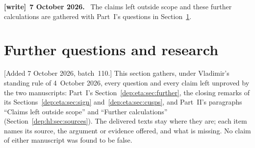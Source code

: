 \documentclass[11pt]{article}
\theoremstyle{definition}\newtheorem{definition}[theorem]{Definition}
\theoremstyle{remark}\newtheorem{remark}[theorem]{Remark}
\newenvironment{writenote}[1][]{\par\smallskip\begingroup\small
 \noindent\textbf{[write]}\if\relax\detokenize{#1}\relax\else~\textbf{#1.}\fi\ }%
 {\par\endgroup\smallskip}
\begin{document}
\begin{writenote}[7 October 2026]
The claims left outside scope and these further calculations are gathered with Part~I's questions in Section~\ref{dep:sec:further}.
\end{writenote}

\section{Further questions and research}\label{dep:sec:further}

[Added 7 October 2026, batch~110.] This section gathers, under Vladimir's
standing rule of 4~October 2026, every question and every claim left
unproved by the two manuscripts: Part~I's Section~\ref{dep:eta:sec:further},
the closing remarks of its Sections~\ref{dep:eta:sec:sign}
and~\ref{dep:eta:sec:cusps}, and Part~II's paragraphs ``Claims left outside
scope'' and ``Further calculations'' (Section~\ref{dep:hl:sec:sources}). The
delivered texts stay where they are; each item names its source, the argument
or evidence offered, and what is missing. No claim of either manuscript was
found to be false.
\end{document}
